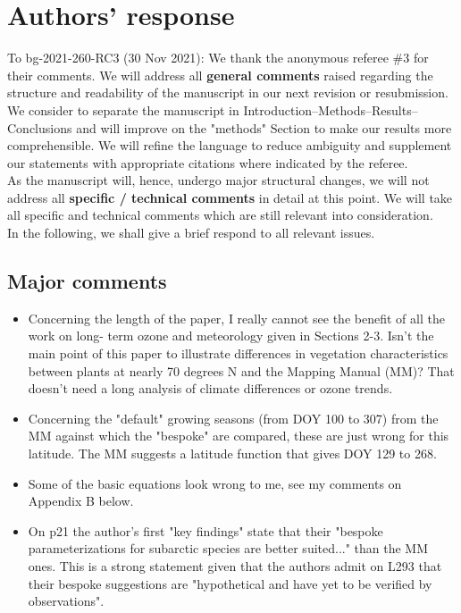 \documentclass{scrartcl}
\begin{document}
\section*{Authors' response}
To bg-2021-260-RC3 (30 Nov 2021):
We thank the anonymous referee \#3 for their comments.
We will address all \textbf{general comments} raised regarding the structure and readability of the manuscript in our next revision or resubmission. We consider to separate the manuscript in Introduction--Methods--Results--Conclusions and will improve on the "methods" Section to make our results more comprehensible. We will refine the language to reduce ambiguity and supplement our statements with appropriate citations where indicated by the referee.\\
As the manuscript will, hence, undergo major structural changes, we will not address all \textbf{specific / technical comments} in detail at this point. We will take all specific and technical comments which are still relevant into consideration.\\
In the following, we shall give a brief respond to all relevant issues.

\subsection*{Major comments} 
\begin{itemize}
    
    \item {\color{blue}Concerning the length of the paper, I really cannot see the benefit of all the work on long-
    term ozone and meteorology given in Sections 2-3. Isn't the main point of this paper to
    illustrate differences in vegetation characteristics between plants at nearly 70 degrees N
    and the Mapping Manual (MM)? That doesn't need a long analysis of climate differences or
    ozone trends.}
    
    \item {\color{blue}Concerning the "default" growing seasons (from DOY 100 to 307) from the MM against
    which the "bespoke" are compared, these are just wrong for this latitude. The MM
    suggests a latitude function that gives DOY 129 to 268.}
    
    \item {\color{blue}Some of the basic equations look wrong to me, see my comments on Appendix B below.}
    
    \item {\color{blue}On p21 the author's first "key findings" state that their "bespoke parameterizations for
    subarctic species are better suited..." than the MM ones. This is a strong statement given
    that the authors admit on L293 that their bespoke suggestions are "hypothetical and have
    yet to be verified by observations".}

\end{itemize}
\end{document}
